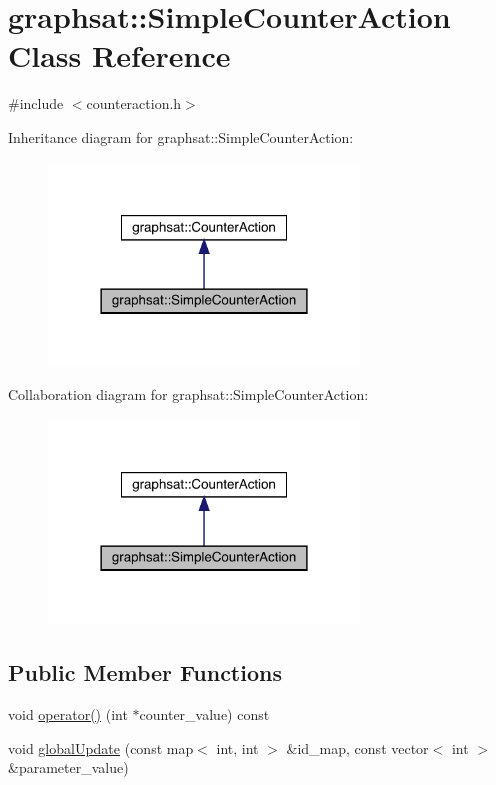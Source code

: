 \hypertarget{classgraphsat_1_1_simple_counter_action}{}\section{graphsat\+::Simple\+Counter\+Action Class Reference}
\label{classgraphsat_1_1_simple_counter_action}


{\ttfamily \#include $<$counteraction.\+h$>$}



Inheritance diagram for graphsat\+::Simple\+Counter\+Action\+:\nopagebreak
\begin{figure}[H]
\begin{center}
\leavevmode
\includegraphics[width=234pt]{classgraphsat_1_1_simple_counter_action__inherit__graph}
\end{center}
\end{figure}


Collaboration diagram for graphsat\+::Simple\+Counter\+Action\+:\nopagebreak
\begin{figure}[H]
\begin{center}
\leavevmode
\includegraphics[width=234pt]{classgraphsat_1_1_simple_counter_action__coll__graph}
\end{center}
\end{figure}
\subsection*{Public Member Functions}
\begin{DoxyCompactItemize}
\item 
void \mbox{\hyperlink{classgraphsat_1_1_simple_counter_action_abe1adcfe43f50662da5daddf59b94bb0}{operator()}} (int $\ast$counter\+\_\+value) const
\item 
void \mbox{\hyperlink{classgraphsat_1_1_simple_counter_action_afec31087ec27170187d831e2de9a2aa4}{global\+Update}} (const map$<$ int, int $>$ \&id\+\_\+map, const vector$<$ int $>$ \&parameter\+\_\+value)
\end{DoxyCompactItemize}
